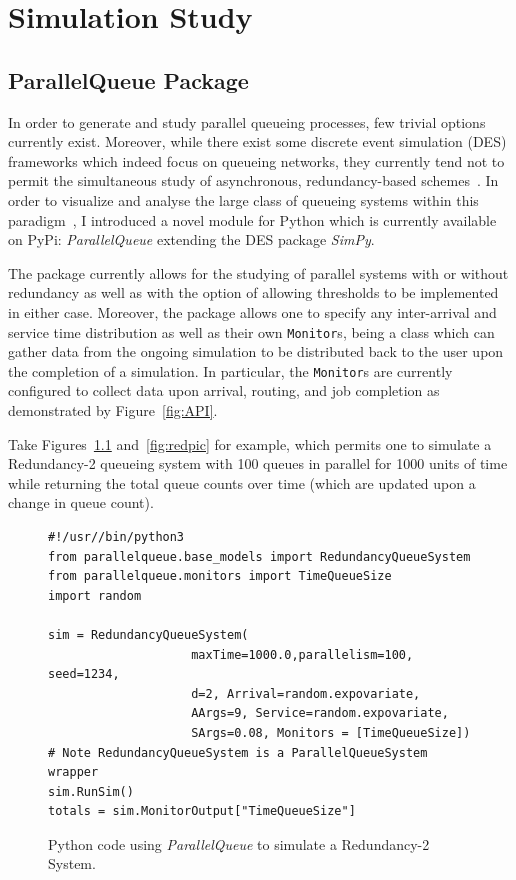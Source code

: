 \chapter{Simulation Study}\label{ch:simulation-study}


\section{ParallelQueue Package}\label{sec:parallelqueue-package}
In order to generate and study parallel queueing processes, few trivial options currently exist.
Moreover, while there exist some discrete event simulation (DES) frameworks which indeed focus on queueing networks, they currently tend not to permit the simultaneous study of asynchronous, redundancy-based schemes~\cite{noauthor_ciwpythonciw_nodate}.
In order to visualize and analyse the large class of queueing systems within this paradigm~\cite{shneer_large-scale_2020,cruise_stability_2020}, I introduced a novel module for Python which is currently available on PyPi: \textit{ParallelQueue} extending the DES package \textit{SimPy}.

The package currently allows for the studying of parallel systems with or without redundancy as well as with the option of allowing thresholds to be implemented in either case.
Moreover, the package allows one to specify any inter-arrival and service time distribution as well as their own \lstinline{Monitor}s, being a class which can gather data from the ongoing simulation to be distributed back to the user upon the completion of a simulation.
In particular, the \lstinline{Monitor}s are currently configured to collect data upon arrival, routing, and job completion as demonstrated by Figure~\ref{fig:API}.

Take Figures~\ref{fig:red} and~\ref{fig:redpic} for example, which permits one to simulate a Redundancy-2 queueing system with 100 queues in parallel for 1000 units of time while returning the total queue counts over time (which are updated upon a change in queue count).

\begin{figure}

    \begin{lstlisting}[label={lst:lstlisting}]
#!/usr//bin/python3
from parallelqueue.base_models import RedundancyQueueSystem
from parallelqueue.monitors import TimeQueueSize
import random

sim = RedundancyQueueSystem(
                    maxTime=1000.0,parallelism=100, seed=1234,
                    d=2, Arrival=random.expovariate,
                    AArgs=9, Service=random.expovariate,
                    SArgs=0.08, Monitors = [TimeQueueSize])
# Note RedundancyQueueSystem is a ParallelQueueSystem wrapper
sim.RunSim()
totals = sim.MonitorOutput["TimeQueueSize"]
    \end{lstlisting}
    \caption{Python code using \textit{ParallelQueue} to simulate a Redundancy-2 System.}
    \label{fig:red}
\end{figure}

